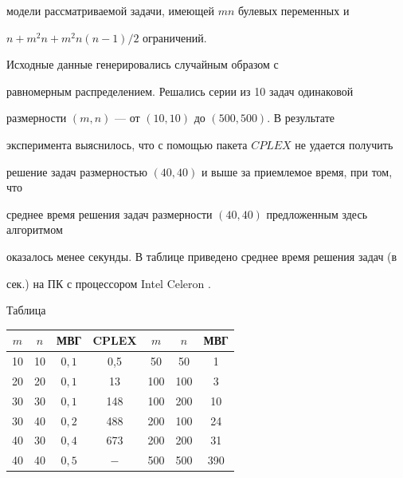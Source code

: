 модели рассматриваемой задачи, имеющей $mn$ булевых переменных и


$n+m^2n+m^2n(n-1)/2$ ограничений.


Исходные данные генерировались случайным образом с


равномерным распределением. Решались серии из 10 задач одинаковой


размерности $(m,n)$ --- от $(10,10)$ до $(500,500)$. В результате


эксперимента выяснилось, что с помощью пакета $CPLEX$ не удается получить


решение задач размерностью $(40,40)$ и выше за приемлемое время, при том, что


среднее время решения задач размерности $(40,40)$ предложенным здесь алгоритмом


оказалось менее секунды. В таблице приведено среднее время решения задач (в


сек.) на ПК с процессором Intel Celeron .


\pagebreak





\begin{center}


Таблица


\smallskip





\begin{tabular}{|c|c|c|c|c|c|c|} \hline


    $m$ &   $n$ &  МВГ &  CPLEX &   $m$ &   $n$ &  МВГ \\ \hline


   10 &  10 &  $0,1$ &  0,5   &  50 &  50 &    1 \\


   20 &  20 &  $0,1$ &   13   & 100 & 100 &    3 \\


   30 &  30 &  $0,1$ &  148   & 100 & 200 &   10 \\


   30 &  40 &  $0,2$ &  488   & 200 & 100 &   24 \\


   40 &  30 &  $0,4$ &  673   & 200 & 200 &   31 \\


   40 &  40 &  $0,5$ &    $-$   & 500 & 500 &  390 \\ \hline


\end{tabular} 


\end{center}





